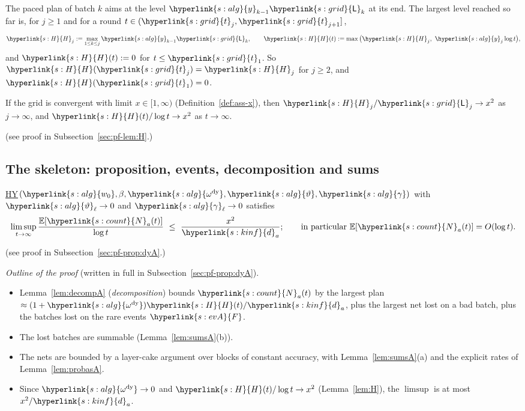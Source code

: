 \documentclass[10pt]{article}
\newcommand{\dt}[1]{\hypertarget{#1}{}}
\newcommand{\sy}[2]{{\hyperlink{#1}{#2}}}
\newcommand{\E}{\mathbb{E}}
\newcommand{\1}{\mathbf{1}}
\newcommand{\da}{\sy{s:kinf}{d}_a}
\newcommand{\Ng}{\sy{s:count}{N}}
\newcommand{\tl}{\sy{s:grid}{t}}
\newcommand{\Lg}{\sy{s:grid}{\mathsf L}}
\newcommand{\HY}{\hyperref[def:hy]{\textup{HY}}}
\newcommand{\wz}{\sy{s:alg}{w_0}}
\newcommand{\yg}{\sy{s:alg}{y}}
\newcommand{\ody}{\sy{s:alg}{\omega^{\mathrm{dy}}}}
\newcommand{\thv}{\sy{s:alg}{\vartheta}}
\newcommand{\gam}{\sy{s:alg}{\gamma}}
\newcommand{\HH}{\sy{s:H}{H}}
\newcommand{\Fg}{\sy{s:evA}{F}}
\begin{document}
\begin{definition}[levels]\label{def:H}\dt{s:H}
The paced plan of batch $k$ aims at the level $\yg_{k-1}\Lg_k$ at its end. The largest level reached so far is, for $j\ge1$ and for a round
$t\in(\tl_j,\tl_{j+1}]$,
\[
\HH_j:=\max_{1\le k\le j}\yg_{k-1}\Lg_k,\qquad\HH(t):=\max\big(\HH_j,\ \yg_j\log t\big),
\]
and $\HH(t):=0$ for $t\le\tl_1$. So $\HH(\tl_j)=\HH_j$ for $j\ge2$, and $\HH(\tl_1)=0$.
\end{definition}

\begin{lemma}\label{lem:H}
If the grid is convergent with limit $x\in[1,\infty)$ (Definition~\ref{def:ass-x}), then $\HH_j/\Lg_j\to x^2$ as $j\to\infty$, and $\HH(t)/\log t\to x^2$ as $t\to\infty$.
\end{lemma}
\noindent(see proof in Subsection~\ref{sec:pf-lem:H}.)

\subsection{The skeleton: proposition, events, decomposition and sums}\label{sec:app-skelA}

\begin{proposition}\label{prop:dyA}
\HY$(\wz,\beta,\ody,\thv,\gam)$ with $\thv_\ell\to0$ and $\gam_\ell\to0$ satisfies
\[
\limsup_{t\to\infty}\frac{\E[\Ng_a(t)]}{\log t}\ \le\ \frac{x^2}{\da};\qquad\text{in particular }\E[\Ng_a(t)]=O(\log t).
\]
\end{proposition}
\noindent(see proof in Subsection~\ref{sec:pf-prop:dyA}.)

\noindent\emph{Outline of the proof} (written in full in Subsection~\ref{sec:pf-prop:dyA}).
\begin{itemize}
\item Lemma~\ref{lem:decompA} (\emph{decomposition}) bounds $\Ng_a(t)$ by the largest plan $\approx(1+\ody)\HH(t)/\da$, plus the largest net lost on a bad batch, plus the
batches lost on the rare events $\Fg$.
\item The lost batches are summable (Lemma~\ref{lem:sumsA}(b)).
\item The nets are bounded by a layer-cake argument over blocks of constant accuracy, with Lemma~\ref{lem:sumsA}(a) and the explicit rates of
Lemma~\ref{lem:probasA}.
\item Since $\ody\to0$ and $\HH(t)/\log t\to x^2$ (Lemma~\ref{lem:H}), the $\limsup$ is at most $x^2/\da$.
\end{itemize}
\end{document}
